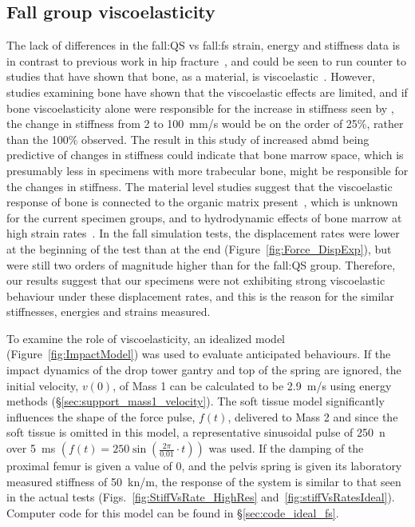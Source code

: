 \subsection{Fall group viscoelasticity}
\label{sec:behave_fail_discssion_relating}
The lack of differences in the fall:\ac{QS} \ac{vs} fall:\ac{fs} strain, energy and stiffness data is in contrast to previous work in hip fracture~\citep{weber_proximal_1992, courtney_effects_1994}, and could be seen to run counter to studies that have shown that bone, as a material, is viscoelastic~\citep{fois_study_2001, carter_compressive_1977}.
However, studies examining bone have shown that the viscoelastic effects are limited, and if bone viscoelasticity alone were responsible for the increase in stiffness seen by \citet{courtney_effects_1994}, the change in stiffness from 2 to 100~\ac{mm}/\ac{s} would be on the order of 25\%, rather than the 100\% observed.
The result in this study of increased \ac{abmd} being predictive of changes in stiffness could indicate that bone marrow space, which is presumably less in specimens with more trabecular bone, might be responsible for the changes in stiffness.
The material level studies suggest that the viscoelastic response of bone is connected to the organic matrix present~\citep{fois_study_2001}, which is unknown for the current specimen groups, and to hydrodynamic effects of bone marrow at high strain rates~\citep{carter_compressive_1977}.
In the fall simulation tests, the displacement rates were lower at the beginning of the test than at the end (Figure~\ref{fig:Force_DispExp}), but were still two orders of magnitude higher than for the fall:\ac{QS} group.
Therefore, our results suggest that our specimens were not exhibiting strong viscoelastic behaviour under these displacement rates, and this is the reason for the similar stiffnesses, energies and strains measured.

To examine the role of viscoelasticity, an idealized model (Figure~\ref{fig:ImpactModel}) was used to evaluate anticipated behaviours.
If the impact dynamics of the drop tower gantry and top of the spring are ignored, the initial velocity, $v(0)$, of Mass 1 can be calculated to be 2.9~\ac{m}/\ac{s} using energy methods (\S\ref{sec:support_mass1_velocity}).
The soft tissue model significantly influences the shape of the force pulse, $f(t)$, delivered to Mass 2 and since the soft tissue is omitted in this model, a representative sinusoidal pulse of 250~\ac{n} over 5~\ac{ms} $ \left( f(t) = 250 \sin(\frac{2\pi}{0.01} \cdot t)\right) $ was used.
If the damping of the proximal femur is given a value of 0, and the pelvis spring is given its laboratory measured stiffness of 50~\ac{kn}/\ac{m}, the response of the system is similar to that seen in the actual tests (Figs.~\ref{fig:StiffVsRate_HighRes} and~\ref{fig:stiffVsRatesIdeal}). Computer code for this model can be found in \S\ref{sec:code_ideal_fs}.

